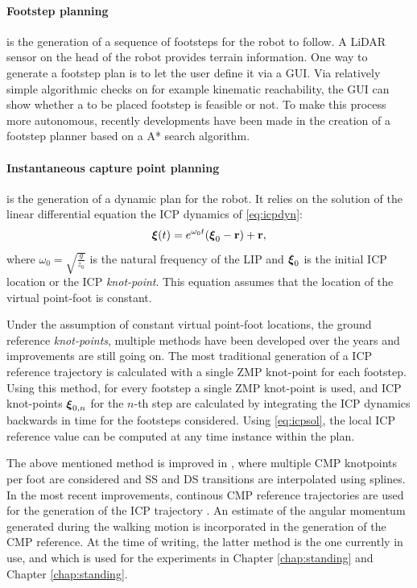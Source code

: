 \paragraph{Footstep planning} is the generation of a sequence of footsteps for the robot to follow. A \ac{LiDAR} sensor on the head of the robot provides terrain information. One way to generate a footstep plan is to let the user define it via a \ac{GUI}. Via relatively simple algorithmic checks on for example kinematic reachability, the \ac{GUI} can show whether a to be placed footstep is feasible or not. To make this process more autonomous, recently developments have been made in the creation of a footstep planner based on a A* search algorithm. 
\paragraph{Instantaneous capture point planning}\label{subsec:icpplan} is the generation of a dynamic plan for the robot. It relies on the solution of the linear differential equation the \ac{ICP} dynamics of \eqref{eq:icpdyn}:
\begin{equation}\label{eq:icpsol}
	\boldsymbol{\xi}(t)=e^{\omega_0t}(\boldsymbol{\xi}_0- \mathbf{r}) + \mathbf{r},
\end{equation}
where $\omega_0=\sqrt{\frac{g}{z_0}}$ is the natural frequency of the \ac{LIP} and $\boldsymbol{\xi}_0$ is the initial \ac{ICP} location or the \ac{ICP} \textit{knot-point}. This equation assumes that the location of the virtual point-foot is constant. 

Under the assumption of constant virtual point-foot locations, the ground reference \textit{knot-points}, multiple methods have been developed over the years and improvements are still going on. The most traditional generation of a \ac{ICP} reference trajectory is calculated with a single \ac{ZMP} knot-point \cite{englsberger2012integration} for each footstep. Using this method, for every footstep a single \ac{ZMP} knot-point is used, and \ac{ICP} knot-points $\boldsymbol{\xi}_{0,n}$ for the $n$-th step are calculated by integrating the \ac{ICP} dynamics backwards in time for the footsteps considered. Using \eqref{eq:icpsol}, the local \ac{ICP} reference value can be computed at any time instance within the plan. 

The above mentioned method is improved in \cite{englsberger2014trajectory}, where multiple \ac{CMP} knotpoints per foot are considered and \ac{SS} and \ac{DS} transitions are interpolated using splines. In the most recent improvements, continous \ac{CMP} reference trajectories are used for the generation of the \ac{ICP} trajectory \cite{seyde2018inclusion}. An estimate of the angular momentum generated during the walking motion is incorporated in the generation of the \ac{CMP} reference. At the time of writing, the latter method is the one currently in use, and which is used for the experiments in Chapter \ref{chap:standing} and Chapter \ref{chap:standing}.
